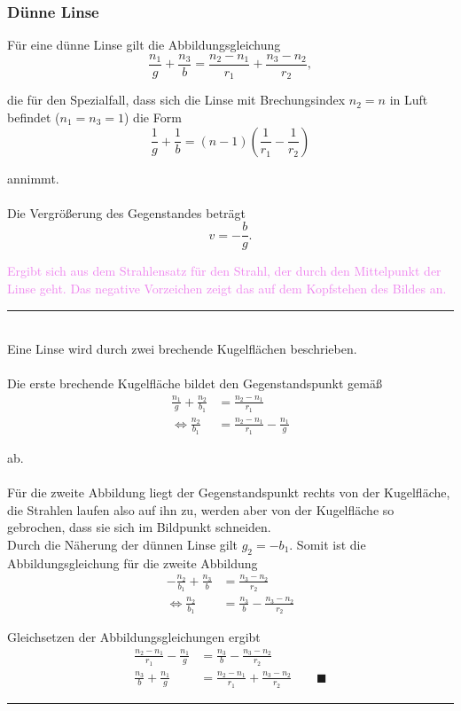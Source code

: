 \documentclass{article}
\newcommand{\lr}[1]{\left(#1\right)}
\begin{document}
\newpage


\subsubsection{Dünne Linse}
Für eine dünne Linse gilt die Abbildungsgleichung
	\begin{equation}
		\frac{n_1}{g} + \frac{n_3}{b} = \frac{n_2 - n_1}{r_1} + \frac{n_3 - n_2}{r_2},
	\end{equation}

die für den Spezialfall, dass sich die Linse mit Brechungsindex $n_2 = n$ in Luft befindet ($n_1=n_3=1$) die Form
	\begin{equation}
		\frac{1}{g} + \frac{1}{b} = (n-1)\lr{ \frac{1}{r_1} - \frac{1}{r_2} }
	\end{equation}

annimmt.\\
\\
Die Vergrößerung des Gegenstandes beträgt
	\begin{equation}
		v = -\frac{b}{g}.
	\end{equation}

\textcolor{violet}{Ergibt sich aus dem Strahlensatz für den Strahl, der durch den Mittelpunkt der Linse geht. Das negative Vorzeichen zeigt das auf dem Kopfstehen des Bildes an.}


{\color{violet}
\hrule
	\\
	Eine Linse wird durch zwei brechende Kugelflächen beschrieben.\\
	\\
	Die erste brechende Kugelfläche bildet den Gegenstandspunkt gemäß
		\begin{align*}
			\frac{n_1}{g} + \frac{n_2}{b_1} &= \frac{n_2 - n_1}{r_1} \\
			\Leftrightarrow \frac{n_2}{b_1} &= \frac{n_2 - n_1}{r_1} - \frac{n_1}{g}
		\end{align*}
	
	ab.\\
	\\
	Für die zweite Abbildung liegt der Gegenstandspunkt rechts von der Kugelfläche, die Strahlen laufen also auf ihn zu, werden aber von der Kugelfläche so gebrochen, dass sie sich im Bildpunkt schneiden.\\
	Durch die Näherung der dünnen Linse gilt $g_2 = -b_1$. Somit ist die Abbildungsgleichung für die zweite Abbildung
		\begin{align*}
			-\frac{n_2}{b_1} + \frac{n_3}{b} &= \frac{n_3 - n_2}{r_2} \\
			\Leftrightarrow \frac{n_2}{b_1} &= \frac{n_3}{b} - \frac{n_3 - n_2}{r_2}
		\end{align*}

	Gleichsetzen der Abbildungsgleichungen ergibt
		\begin{align*}
			\frac{n_2 - n_1}{r_1} - \frac{n_1}{g} &= \frac{n_3}{b} - \frac{n_3 - n_2}{r_2} \\
			 \frac{n_3}{b} + \frac{n_1}{g} &= \frac{n_2 - n_1}{r_1} + \frac{n_3 - n_2}{r_2} \qquad \blacksquare
		\end{align*}


\hrule
}
\end{document}
